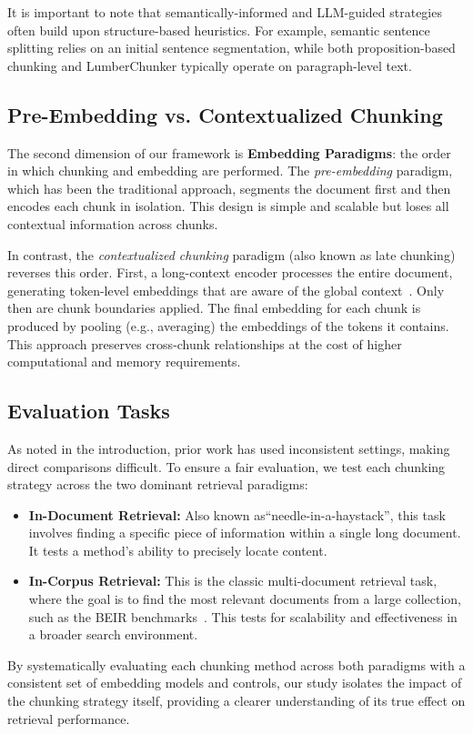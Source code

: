 It is important to note that semantically-informed and LLM-guided strategies often build upon structure-based heuristics. For example, semantic sentence splitting relies on an initial sentence segmentation, while both proposition-based chunking and LumberChunker typically operate on paragraph-level text.

\subsection{Pre-Embedding vs. Contextualized Chunking}

The second dimension of our framework is \textbf{Embedding Paradigms}: the order in which chunking and embedding are performed.
The \textit{pre-embedding} paradigm, which has been the traditional approach, segments the document first and then encodes each chunk in isolation. This design is simple and scalable but loses all contextual information across chunks.

In contrast, the \textit{contextualized chunking} paradigm (also known as late chunking) reverses this order. First, a long-context encoder processes the entire document, generating token-level embeddings that are aware of the global context~\cite{gunther_late_2025}. Only then are chunk boundaries applied. The final embedding for each chunk is produced by pooling (e.g., averaging) the embeddings of the tokens it contains. This approach preserves cross-chunk relationships at the cost of higher computational and memory requirements.

\subsection{Evaluation Tasks}
As noted in the introduction, prior work has used inconsistent settings, making direct comparisons difficult. To ensure a fair evaluation, we test each chunking strategy across the two dominant retrieval paradigms:
\begin{itemize}
	\item \textbf{In-Document Retrieval:} Also known as``needle-in-a-haystack'', this task involves finding a specific piece of information within a single long document. It tests a method's ability to precisely locate content.
	\item \textbf{In-Corpus Retrieval:} This is the classic multi-document retrieval task, where the goal is to find the most relevant documents from a large collection, such as the BEIR benchmarks~\cite{thakur_beir_2021}. This tests for scalability and effectiveness in a broader search environment.
\end{itemize}
By systematically evaluating each chunking method across both paradigms with a consistent set of embedding models and controls, our study isolates the impact of the chunking strategy itself, providing a clearer understanding of its true effect on retrieval performance.
